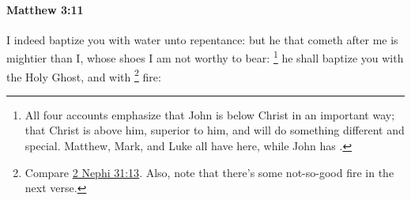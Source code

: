 			\begin{framed}
			\scriptsize
				\begin{compactdesc}
					\item[SBLG] 
				\end{compactdesc}
			\end{framed}

		\paragraph{Matthew 3:11} %
			\label{MATTHEW-3-11}

			I indeed baptize you with water unto repentance: but he that cometh after me is mightier than I, whose shoes I am not worthy to bear:%
				\footnote{%
					All four accounts emphasize that John is below Christ in an important way; that Christ is above him, superior to him, and will do something different and special. Matthew, Mark, and Luke all have  here, while John has .
					}
			he shall baptize you with the Holy Ghost, and with
				\footnote{%
					Compare \hyperref[2NEPHI-31-13]{2 Nephi 31:13}. Also, note that there's some not-so-good fire in the next verse.
					}%
			fire:

